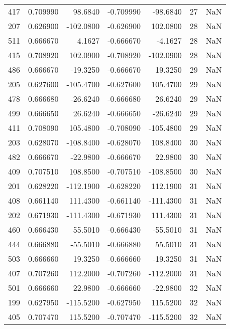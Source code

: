 \begin{tabular}{rrrrrrr}
 417 &    0.709990 &   98.6840 &   -0.709990 &    -98.6840 &          27 & NaN \\
 207 &    0.626900 & -102.0800 &   -0.626900 &    102.0800 &          28 & NaN \\
 511 &    0.666670 &    4.1627 &   -0.666670 &     -4.1627 &          28 & NaN \\
 415 &    0.708920 &  102.0900 &   -0.708920 &   -102.0900 &          28 & NaN \\
 486 &    0.666670 &  -19.3250 &   -0.666670 &     19.3250 &          29 & NaN \\
 205 &    0.627600 & -105.4700 &   -0.627600 &    105.4700 &          29 & NaN \\
 478 &    0.666680 &  -26.6240 &   -0.666680 &     26.6240 &          29 & NaN \\
 499 &    0.666650 &   26.6240 &   -0.666650 &    -26.6240 &          29 & NaN \\
 411 &    0.708090 &  105.4800 &   -0.708090 &   -105.4800 &          29 & NaN \\
 203 &    0.628070 & -108.8400 &   -0.628070 &    108.8400 &          30 & NaN \\
 482 &    0.666670 &  -22.9800 &   -0.666670 &     22.9800 &          30 & NaN \\
 409 &    0.707510 &  108.8500 &   -0.707510 &   -108.8500 &          30 & NaN \\
 201 &    0.628220 & -112.1900 &   -0.628220 &    112.1900 &          31 & NaN \\
 408 &    0.661140 &  111.4300 &   -0.661140 &   -111.4300 &          31 & NaN \\
 202 &    0.671930 & -111.4300 &   -0.671930 &    111.4300 &          31 & NaN \\
 460 &    0.666430 &   55.5010 &   -0.666430 &    -55.5010 &          31 & NaN \\
 444 &    0.666880 &  -55.5010 &   -0.666880 &     55.5010 &          31 & NaN \\
 503 &    0.666660 &   19.3250 &   -0.666660 &    -19.3250 &          31 & NaN \\
 407 &    0.707260 &  112.2000 &   -0.707260 &   -112.2000 &          31 & NaN \\
 501 &    0.666660 &   22.9800 &   -0.666660 &    -22.9800 &          32 & NaN \\
 199 &    0.627950 & -115.5200 &   -0.627950 &    115.5200 &          32 & NaN \\
 405 &    0.707470 &  115.5200 &   -0.707470 &   -115.5200 &          32 & NaN \\

\end{tabular}
